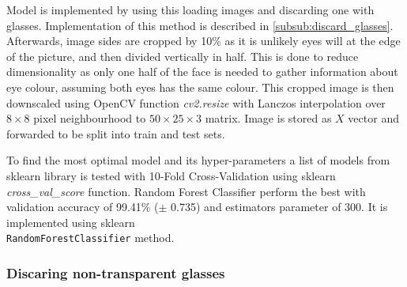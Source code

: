 \documentclass{article}
\begin{document}
Model is implemented by using this loading images and discarding one with glasses. Implementation of this method is described in \autoref{subsub:discard_glasses}. Afterwards, image sides are cropped by 10\% as it is unlikely eyes will at the edge of the picture, and then divided vertically in half. This is done to reduce dimensionality as only one half of the face is needed to gather information about eye colour, assuming both eyes has the same colour. This cropped image is then downscaled using OpenCV function \textit{cv2.resize} with Lanczos interpolation over $8\times 8$ pixel neighbourhood to $50\times 25 \times3$ matrix. %
Image is stored as $X$ vector and forwarded to be split into train and test sets. 


To find the most optimal model and its hyper-parameters a list of models from sklearn library is tested with 10-Fold Cross-Validation using sklearn \textit{cross\_val\_score} function. Random Forest Classifier perform the best with validation accuracy of 99.41\% ($\pm$ 0.735) and estimators parameter of 300. It is implemented using sklearn \\\texttt{RandomForestClassifier} method.

\subsubsection{Discaring non-transparent glasses}
\label{subsub:discard_glasses}
\end{document}
